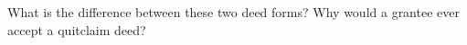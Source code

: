 \item What is the difference between these two deed forms? Why would a grantee
ever accept a quitclaim deed?

